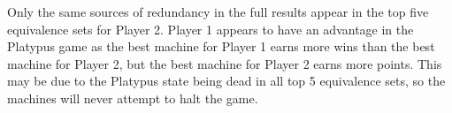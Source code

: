 Only the same sources of redundancy in the full results appear in the
top five equivalence sets for Player 2. Player 1 appears to have an advantage
in the Platypus game as the best machine for Player 1 earns more wins than
the best machine for Player 2, but the best machine for Player 2 earns
more points. This may be due to the Platypus state being dead in all top 5
equivalence sets, so the machines will never attempt to halt the game.